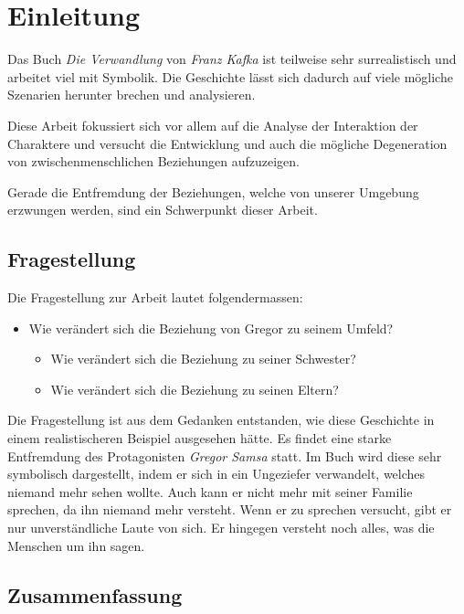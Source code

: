 \documentclass[12pt,a4paper,twoside,titlepage]{article}
\title{\titleText} %
\author{\authorText}
\date{\dateText}
\let\oldsection\section
\renewcommand\section{\clearpage\oldsection}
\begin{document}
	\maketitle
	
	\tableofcontents
	
	\section{Einleitung}
	
	
	Das Buch \textit{Die Verwandlung} von \textit{Franz Kafka} ist teilweise sehr surrealistisch und arbeitet viel mit Symbolik. Die Geschichte lässt sich dadurch auf viele mögliche Szenarien herunter brechen und analysieren.
	
	Diese Arbeit fokussiert sich vor allem auf die Analyse der Interaktion der Charaktere und versucht die Entwicklung und auch die mögliche Degeneration von zwischenmenschlichen Beziehungen aufzuzeigen.
	
	Gerade die Entfremdung der Beziehungen, welche von unserer Umgebung erzwungen werden, sind ein Schwerpunkt dieser Arbeit.
	
	
	\subsection{Fragestellung}
	Die Fragestellung zur Arbeit lautet folgendermassen:
	\begin{itemize}
		\item Wie verändert sich die Beziehung von Gregor zu seinem Umfeld?
		\begin{itemize}
			\item Wie verändert sich die Beziehung zu seiner Schwester?
			\item Wie verändert sich die Beziehung zu seinen Eltern?
		\end{itemize}
	\end{itemize}
	
	Die Fragestellung ist aus dem Gedanken entstanden, wie diese Geschichte in einem realistischeren Beispiel ausgesehen hätte. Es findet eine starke Entfremdung des Protagonisten \textit{Gregor Samsa} statt. Im Buch wird diese sehr symbolisch dargestellt, indem er sich in ein Ungeziefer verwandelt, welches niemand mehr sehen wollte. Auch kann er nicht mehr mit seiner Familie sprechen, da ihn niemand mehr versteht. Wenn er zu sprechen versucht, gibt er nur unverständliche Laute von sich. Er hingegen versteht noch alles, was die Menschen um ihn sagen.
	
	\subsection{Zusammenfassung}
	
\end{document}
